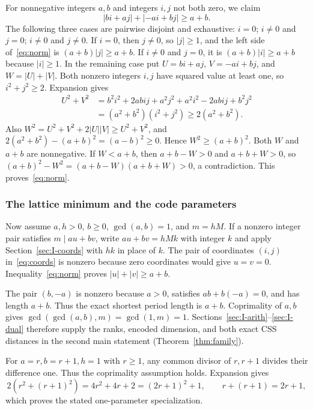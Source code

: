 \documentclass{article}
\numberwithin{equation}{section}
\begin{document}
For nonnegative integers \(a,b\) and integers \(i,j\) not both zero, we claim
\begin{equation}\label{eq:norm}
  |bi+aj|+|-ai+bj|\ge a+b.
\end{equation}
The following three cases are pairwise disjoint and exhaustive: \(i=0\);
\(i\ne0\) and \(j=0\); \(i\ne0\) and \(j\ne0\). If \(i=0\), then \(j\ne0\), so
\(|j|\ge1\), and the left side of~\eqref{eq:norm} is \((a+b)|j|\ge a+b\). If \(i\ne0\)
and \(j=0\), it is \((a+b)|i|\ge a+b\) because \(|i|\ge1\). In the remaining
case put \(U=bi+aj\), \(V=-ai+bj\), and \(W=|U|+|V|\). Both nonzero integers
\(i,j\) have squared value at least one, so \(i^2+j^2\ge2\). Expansion gives
\begin{equation}\label{eq:UV-square}
  \begin{aligned}
    U^2+V^2
     &=b^2i^2+2abij+a^2j^2+a^2i^2-2abij+b^2j^2\\
     &=(a^2+b^2)(i^2+j^2)\ge2(a^2+b^2).
  \end{aligned}
\end{equation}
Also \(W^2=U^2+V^2+2|U||V|\ge U^2+V^2\), and
\(2(a^2+b^2)-(a+b)^2=(a-b)^2\ge0\). Hence \(W^2\ge(a+b)^2\).
Both \(W\) and \(a+b\) are nonnegative. If \(W<a+b\), then \(a+b-W>0\) and
\(a+b+W>0\), so
\((a+b)^2-W^2=(a+b-W)(a+b+W)>0\), a contradiction. This proves~\eqref{eq:norm}.

\subsubsection{The lattice minimum and the code parameters}\label{sec:I-minimum}

Now assume \(a,h>0\), \(b\ge0\), \(\gcd(a,b)=1\), and \(m=hM\). If a nonzero
integer pair satisfies \(m\mid au+bv\), write \(au+bv=hMk\) with integer
\(k\) and apply Section~\ref{sec:I-coords} with \(hk\) in place of \(k\). The pair of
coordinates \((i,j)\) in~\eqref{eq:coords} is nonzero because zero coordinates would
give \(u=v=0\). Inequality~\eqref{eq:norm} proves \(|u|+|v|\ge a+b\).

The pair \((b,-a)\) is nonzero because \(a>0\), satisfies
\(ab+b(-a)=0\), and has length \(a+b\). Thus the exact shortest period
length is \(a+b\). Coprimality of \(a,b\) gives
\(\gcd(\gcd(a,b),m)=\gcd(1,m)=1\). Sections~\ref{sec:I-arith}--\ref{sec:I-dual}
therefore supply the
ranks, encoded dimension, and both exact CSS distances in the second
main statement (Theorem~\ref{thm:family}).

For \(a=r,b=r+1,h=1\) with \(r\ge1\), any common divisor of \(r,r+1\)
divides their difference one. Thus the coprimality assumption holds.
Expansion gives
\begin{equation}\label{eq:specialization}
  2(r^2+(r+1)^2)=4r^2+4r+2=(2r+1)^2+1,\qquad
  r+(r+1)=2r+1,
\end{equation}
which proves the stated one-parameter specialization.
\end{document}
